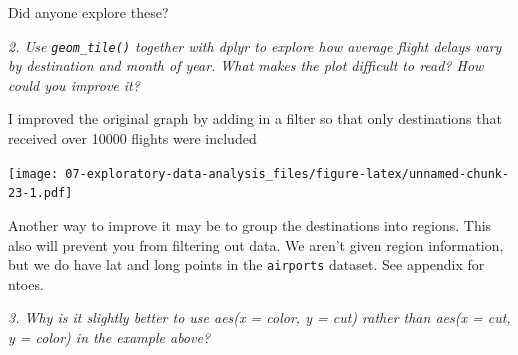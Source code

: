 \documentclass[]{book}
\newenvironment{Shaded}{\begin{snugshade}}{\end{snugshade}}
\newcommand{\CommentTok}[1]{\textcolor[rgb]{0.56,0.35,0.01}{\textit{#1}}}
\newcommand{\DataTypeTok}[1]{\textcolor[rgb]{0.13,0.29,0.53}{#1}}
\newcommand{\DecValTok}[1]{\textcolor[rgb]{0.00,0.00,0.81}{#1}}
\newcommand{\KeywordTok}[1]{\textcolor[rgb]{0.13,0.29,0.53}{\textbf{#1}}}
\newcommand{\NormalTok}[1]{#1}
\newcommand{\OperatorTok}[1]{\textcolor[rgb]{0.81,0.36,0.00}{\textbf{#1}}}
\newcommand{\OtherTok}[1]{\textcolor[rgb]{0.56,0.35,0.01}{#1}}
\newcommand{\StringTok}[1]{\textcolor[rgb]{0.31,0.60,0.02}{#1}}
\theoremstyle{definition}
\theoremstyle{definition}
\theoremstyle{definition}
\theoremstyle{remark}
\begin{document}
Did anyone explore these?

\emph{2. Use \texttt{geom\_tile()} together with dplyr to explore how
average flight delays vary by destination and month of year. What makes
the plot difficult to read? How could you improve it?}

I improved the original graph by adding in a filter so that only
destinations that received over 10000 flights were included

\begin{Shaded}
\end{Shaded}

\texttt{[image: 07-exploratory-data-analysis\_files/figure-latex/unnamed-chunk-23-1.pdf]}

Another way to improve it may be to group the destinations into regions.
This also will prevent you from filtering out data. We aren't given
region information, but we do have lat and long points in the
\texttt{airports} dataset. See appendix for ntoes.

\emph{3. Why is it slightly better to use aes(x = color, y = cut) rather
than aes(x = cut, y = color) in the example above?}
\end{document}
